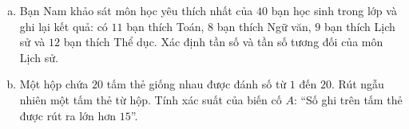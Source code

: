 \begin{bt}%
	\begin{enumerate}[a)]
		\item Bạn Nam khảo sát môn học yêu thích nhất của $40$ bạn học sinh trong lớp và ghi lại kết quả: có $11$ bạn thích Toán, $8$ bạn thích Ngữ văn, $9$ bạn thích Lịch sử và $12$ bạn thích Thể dục. Xác định tần số và tần số tương đối của môn Lịch sử.
		\item Một hộp chứa $20$ tấm thẻ giống nhau được đánh số từ $1$ đến $20$. Rút ngẫu nhiên một tấm thẻ từ hộp. Tính xác suất của biến cố $A$: ``Số ghi trên tấm thẻ được rút ra lớn hơn $15$''.
	\end{enumerate}
\end{bt}

